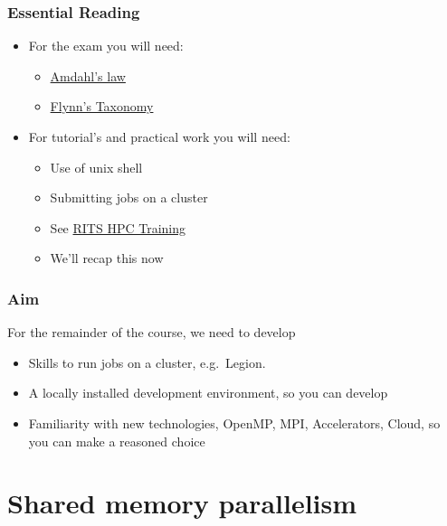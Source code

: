 \subsubsection{Essential Reading}\label{essential-reading-1}

\begin{itemize}
\itemsep1pt\parskip0pt
\item
  For the exam you will need:

  \begin{itemize}
  \itemsep1pt\parskip0pt
  \item
    \href{https://en.wikipedia.org/wiki/Amdahl\%27s_law}{Amdahl's law}
  \item
    \href{https://en.wikipedia.org/wiki/Flynn\%27s_taxonomy}{Flynn's
    Taxonomy}
  \end{itemize}
\item
  For tutorial's and practical work you will need:

  \begin{itemize}
  \itemsep1pt\parskip0pt
  \item
    Use of unix shell
  \item
    Submitting jobs on a cluster
  \item
    See \href{http://github-pages.ucl.ac.uk/RCPSTrainingMaterials/}{RITS
    HPC Training}
  \item
    We'll recap this now
  \end{itemize}
\end{itemize}

\subsubsection{Aim}\label{aim-1}

For the remainder of the course, we need to develop

\begin{itemize}
\itemsep1pt\parskip0pt
\item
  Skills to run jobs on a cluster, e.g.~Legion.
\item
  A locally installed development environment, so you can develop
\item
  Familiarity with new technologies, OpenMP, MPI, Accelerators, Cloud,
  so you can make a reasoned choice
\end{itemize}

\section{Shared memory parallelism}\label{shared-memory-parallelism}

